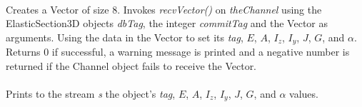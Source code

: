 \\
Creates a Vector of size $8$. Invokes {\em recvVector()} on  {\em
theChannel} using the ElasticSection3D objects {\em dbTag}, the integer
{\em commitTag} and the Vector as arguments. Using the data in the
Vector to set its {\em tag}, $E$, $A$, $I_z$, $I_y$, $J$, $G$, and $\alpha$.
Returns $0$ if successful, a warning message is printed and a negative number
is returned if the Channel object fails to receive the Vector. \\

 \\
Prints to the stream {\em s} the object's {\em tag}, $E$, $A$, $I_z$, $I_y$, $J$, 
$G$, and $\alpha$ values. \\



